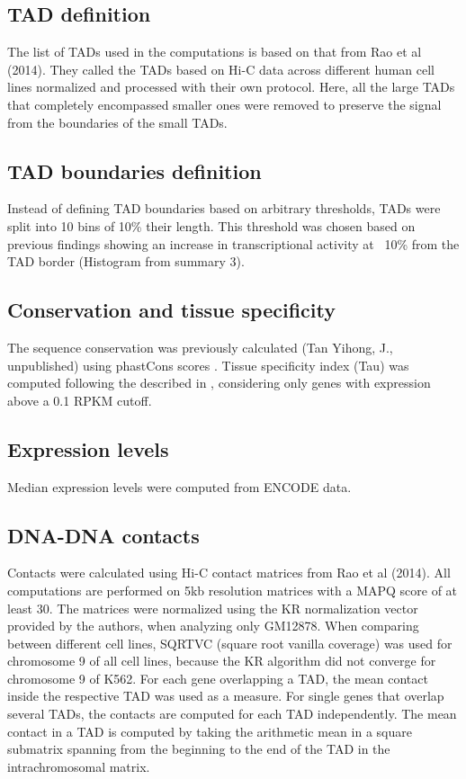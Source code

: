 \documentclass[10pt,a4paper]{report}
\begin{document}
\subsection*{TAD definition}

The list of TADs used in the computations is based on that from Rao et al (2014). They called the TADs based on Hi-C data across different human cell lines normalized and processed with their own protocol. Here, all the large TADs that completely encompassed smaller ones were removed to preserve the signal from the boundaries of the small TADs.


\subsection*{TAD boundaries definition}

Instead of defining TAD boundaries based on arbitrary thresholds, TADs were split into 10 bins of 10\% their length. This threshold was chosen based on previous findings showing an increase in transcriptional activity at ~10\% from the TAD border (Histogram from summary 3).

\subsection*{Conservation and tissue specificity}

The sequence conservation was previously calculated (Tan Yihong, J., unpublished) using phastCons scores \cite{Siepel2005}⁠. Tissue specificity index (Tau) was computed following the described in \cite{Kryuchkova2015}, considering only genes with expression above a 0.1 RPKM cutoff.

\subsection*{Expression levels}

Median expression levels were computed from ENCODE data.

\subsection*{DNA-DNA contacts}

Contacts were calculated using Hi-C contact matrices from Rao et al (2014). All computations are performed on 5kb resolution matrices with a MAPQ score of at least 30. The matrices were normalized using the KR normalization vector provided by the authors, when analyzing only GM12878. When comparing between different cell lines, SQRTVC (square root vanilla coverage) was used for chromosome 9 of all cell lines, because the KR algorithm did not converge for chromosome 9 of K562.
For each gene overlapping a TAD, the mean contact inside the respective TAD was used as a measure. For single genes that overlap several TADs, the contacts are computed for each TAD independently. The mean contact in a TAD is computed by taking the arithmetic mean in a square submatrix spanning from the beginning to the end of the TAD in the intrachromosomal matrix.
\end{document}
